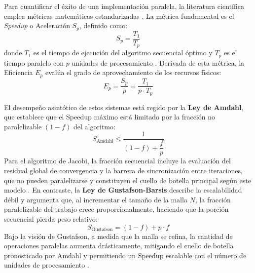 Para cuantificar el éxito de una implementación paralela, la literatura científica emplea
métricas matemáticas estandarizadas \parencite{hager2010hpc}. La métrica fundamental es el
\textit{Speedup} o Aceleración $S_p$, definido como:
\begin{equation}
    S_p = \frac{T_1}{T_p}
    \label{eq:speedup}
\end{equation}
donde $T_1$ es el tiempo de ejecución del algoritmo secuencial óptimo y $T_p$ es el
tiempo paralelo con $p$ unidades de procesamiento \parencite{hager2010hpc}. Derivada de esta
métrica, la Eficiencia $E_p$ evalúa el grado de aprovechamiento de los recursos físicos:
\begin{equation}
    E_p = \frac{S_p}{p} = \frac{T_1}{p \cdot T_p}
    \label{eq:eficiencia}
\end{equation}

El desempeño asintótico de estos sistemas está regido por la \textbf{Ley de Amdahl}, que
establece que el Speedup máximo está limitado por la fracción no paralelizable $(1-f)$
del algoritmo:
\begin{equation}
    S_{\text{Amdahl}} \leq \frac{1}{(1-f) + \dfrac{f}{p}}
    \label{eq:amdahl}
\end{equation}
Para el algoritmo de Jacobi, la fracción secuencial incluye la evaluación del residual
global de convergencia y la barrera de sincronización entre iteraciones, que no pueden
paralelizarse y constituyen el cuello de botella principal según este modelo
\parencite{patterson2017computer}. En contraste, la \textbf{Ley de Gustafson-Barsis} describe
la escalabilidad débil y argumenta que, al incrementar el tamaño de la malla $N$, la
fracción paralelizable del trabajo crece proporcionalmente, haciendo que la porción
secuencial pierda peso relativo:
\begin{equation}
    S_{\text{Gustafson}} = (1-f) + p \cdot f
    \label{eq:gustafson}
\end{equation}
Bajo la visión de Gustafson, a medida que la malla se refina, la cantidad de operaciones
paralelas aumenta drásticamente, mitigando el cuello de botella pronosticado por Amdahl y
permitiendo un Speedup escalable con el número de unidades de procesamiento
\parencite{gustafson1988reevaluating}.
